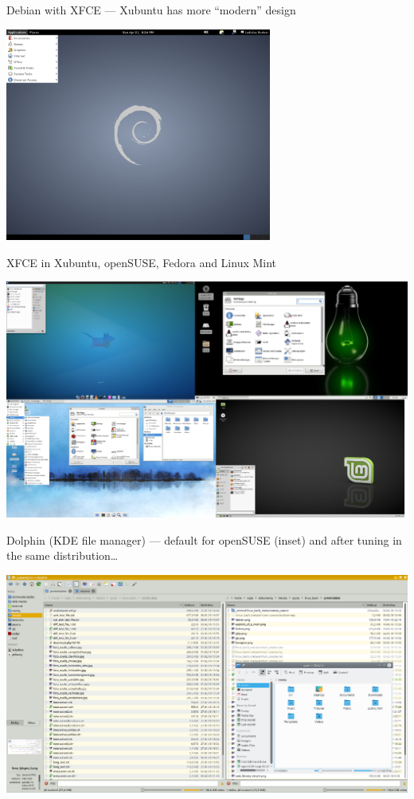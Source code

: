 \documentclass[compress, ucs, xelatex, 11pt, xcolor=svgnames,
  hyperref={
    bookmarks=true,
    unicode=true,
    colorlinks=true,
    pdftitle={Linux, command line and MetaCentrum},
    plainpages=false,
    pdfauthor={Vojtech Zeisek},
    pdfsubject={Course about use of Linux command line, writing shell scripts and using MetaCentrum of CESNET},
    pdfcreator={XeLaTeX},
    pdfkeywords={Linux, GNU, BASH, shell, command line, MetaCentrum},
    linkcolor=DarkRed,
    anchorcolor=DarkBlue,
    citecolor=Indigo,
    filecolor=NavyBlue,
    menucolor=DarkMagenta,
    urlcolor=DarkBlue,
    pdftex},
  url={hyphens, lowtilde} %
  ]{beamer}
\begin{document}
\begin{frame}{Debian with XFCE --- Xubuntu has more ``modern'' design} %
  \begin{center}
    \includegraphics[height=7cm]{debian.png}
  \end{center}
\end{frame}

\begin{frame}{XFCE in Xubuntu, openSUSE, Fedora and Linux Mint} %
  \begin{center}
    \includegraphics[width=\textwidth]{xfce.png}
  \end{center}
\end{frame}

\begin{frame}{Dolphin (KDE file manager) --- default for openSUSE (inset) and after tuning in the same distribution\ldots} %
  \begin{center}
    \includegraphics[width=\textwidth-0.5cm]{dolphin.png}
  \end{center}
\end{frame}
\end{document}
